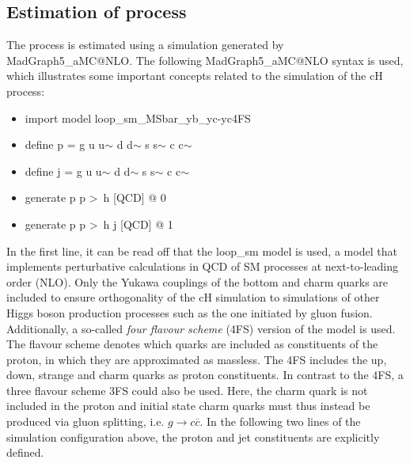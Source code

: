 \subsection{Estimation of \cHZZsen process}
\label{sec:cHSimulation}
The \cHZZsen process is estimated using a simulation generated by \textsf{MadGraph5\_aMC@NLO}\cite{MadGraph}. The following \textsf{MadGraph5\_aMC@NLO} syntax is used, which illustrates some important concepts related to the simulation of the cH process:
\begin{itemize}
    \label{MadGraphcHCommand}
    \itemsep0em 
    \item[] import model loop\_sm\_MSbar\_yb\_yc-yc4FS 
    \item[] define p = g u u$\sim$ d d$\sim$ s s$\sim$ c c$\sim$ 
    \item[] define j = g u u$\sim$ d d$\sim$ s s$\sim$ c c$\sim$ 
    \item[] generate p p \textgreater\, h [QCD] @ 0 
    \item[] generate p p \textgreater\, h j [QCD] @ 1
\end{itemize}
In the first line, it can be read off that the \textsf{loop\_sm} model is used, a model that implements perturbative calculations in QCD of SM processes at next-to-leading order (NLO). Only the Yukawa couplings of the bottom and charm quarks are included to ensure orthogonality of the cH simulation to simulations of other Higgs boson production processes such as the one initiated by gluon fusion. Additionally, a so-called \textit{four flavour scheme} (4FS) version of the model is used. The flavour scheme denotes which quarks are included as constituents of the proton, in which they are approximated as massless. The 4FS includes the up, down, strange and charm quarks as proton constituents. In contrast to the 4FS, a three flavour scheme 3FS could also be used. Here, the charm quark is not included in the proton and initial state charm quarks must thus instead be produced via gluon splitting, i.e. $g \rightarrow c\overline{c}$. In the following two lines of the simulation configuration above, the proton and jet constituents are explicitly defined. \\
\\
